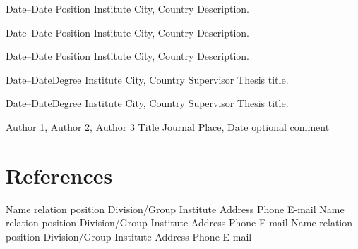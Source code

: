\documentclass{elegant-cv}
\begin{document}

\makeHead


\begin{ProfessionalExperiences}

\addExperience
	{Date--Date}
	{Position}
	{Institute}
	{City, Country}
	{Description.}

\addExperience
	{Date--Date}
	{Position}
	{Institute}
	{City, Country}
	{Description.}

\addExperience
	{Date--Date}
	{Position}
	{Institute}
	{City, Country}
	{Description.}

\end{ProfessionalExperiences}

\begin{Education}

\addDegree
	{Date--Date}{Degree}
	{Institute}
	{City, Country}
	{Supervisor}
	{Thesis title.}

\addDegree
	{Date--Date}{Degree}
	{Institute}
	{City, Country}
	{Supervisor}
	{Thesis title.}


\end{Education}

\begin{LanguageCompetences}


\end{LanguageCompetences}

\begin{Skills}


\end{Skills}

\begin{Publications}

\begin{Articles}

\addPublication
{Author 1, \underline{Author 2}, Author 3}
{Title}
{Journal}
{Place, Date}
{optional comment}

\end{Articles}

\end{Publications}

\section{References}

\addReference
{Name}
{relation}
{position}
{Division/Group}
{Institute}
{Address}
{Phone}
{E-mail}
\addReference
{Name}
{relation}
{position}
{Division/Group}
{Institute}
{Address}
{Phone}
{E-mail}
\addReference
{Name}
{relation}
{position}
{Division/Group}
{Institute}
{Address}
{Phone}
{E-mail}
\end{document}
